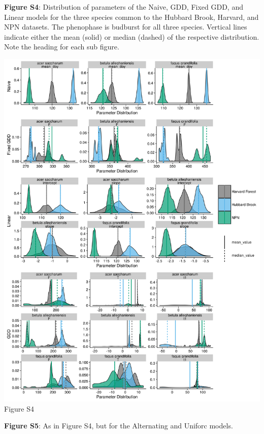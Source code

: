 \documentclass[a4paper,12pt]{article}
\begin{document}
\newpage

\textbf{Figure S4}: Distribution of parameters of the Naive, GDD, Fixed GDD, and Linear models for the three species common to the Hubbard Brook, Harvard, and NPN datasets. The phenophase is budburst for all three species. Vertical lines indicate either the mean (solid) or median (dashed) of the respective distribution. Note the heading for each sub figure. 

\newpage

\begin{center}
	\centering
		\includegraphics[scale=0.5]{supplement_hubbard_harvard_comparison1.png}
	Figure S4
\end{center}

\newpage

\textbf{Figure S5}: As in Figure S4, but for the Alternating and Uniforc models. 
\end{document}

